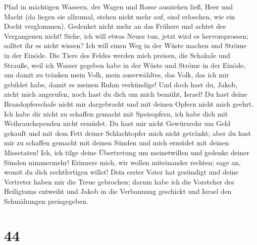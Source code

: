Pfad in mächtigen Wassern,  der Wagen und Rosse ausziehen
ließ, Heer und Macht (da liegen sie allzumal, stehen nicht mehr auf,
sind erloschen, wie ein Docht verglommen).  Gedenket
nicht mehr an das Frühere und achtet des Vergangenen nicht!
 Siehe, ich will etwas Neues tun, jetzt wird es
hervorsprossen; solltet ihr es nicht wissen? Ich will einen Weg in der
Wüste machen und Ströme in der Einöde.  Die Tiere des
Feldes werden mich preisen, die Schakale und Strauße, weil ich Wasser
gegeben habe in der Wüste und Ströme in der Einöde, um damit zu tränken
mein Volk, mein auserwähltes,  das Volk, das ich mir
gebildet habe, damit es meinen Ruhm verkündige!  Und doch
hast du, Jakob, nicht mich angerufen, noch hast du dich um mich bemüht,
Israel!  Du hast deine Brandopferschafe nicht mir
dargebracht und mit deinen Opfern nicht mich geehrt. Ich habe dir nicht
zu schaffen gemacht mit Speisopfern, ich habe dich mit Weihrauchspenden
nicht ermüdet.  Du hast mir nicht Gewürzrohr um Geld
gekauft und mit dem Fett deiner Schlachtopfer mich nicht getränkt; aber
du hast mir zu schaffen gemacht mit deinen Sünden und mich ermüdet mit
deinen Missetaten!  Ich, ich tilge deine Übertretung um
meinetwillen und gedenke deiner Sünden nimmermehr! 
Erinnere mich, wir wollen miteinander rechten; sage an, womit du dich
rechtfertigen willst!  Dein erster Vater hat gesündigt
und deine Vertreter haben mir die Treue gebrochen;  darum
habe ich die Vorsteher des Heiligtums entweiht und Jakob in die
Verbannung geschickt und Israel den Schmähungen preisgegeben.

\hypertarget{section-43}{%
\section{44}\label{section-43}}

